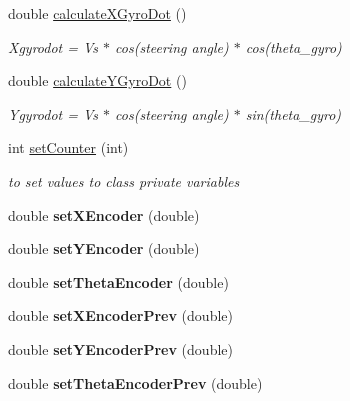 \begin{DoxyCompactItemize}
double \hyperlink{classPoseEstimator_aef49b0372edb2fe14499e6ae4ee237b7}{calculate\+X\+Gyro\+Dot} ()
\begin{DoxyCompactList}\small\item\em Xgyrodot = Vs $\ast$ cos(steering angle) $\ast$ cos(theta\+\_\+gyro) \end{DoxyCompactList}\item 
double \hyperlink{classPoseEstimator_a55a8b278aa3c3f171fff3b3501d5b14c}{calculate\+Y\+Gyro\+Dot} ()
\begin{DoxyCompactList}\small\item\em Ygyrodot = Vs $\ast$ cos(steering angle) $\ast$ sin(theta\+\_\+gyro) \end{DoxyCompactList}\item 
int \hyperlink{classPoseEstimator_a4dfacf5e449db6fc1398efd19e282b86}{set\+Counter} (int)
\begin{DoxyCompactList}\small\item\em to set values to class private variables \end{DoxyCompactList}\item 
double {\bfseries set\+X\+Encoder} (double)\hypertarget{classPoseEstimator_a4243ef5d948831d751a5dcb3685ba7ee}{}\label{classPoseEstimator_a4243ef5d948831d751a5dcb3685ba7ee}

\item 
double {\bfseries set\+Y\+Encoder} (double)\hypertarget{classPoseEstimator_abba09afe95f5a3932304987db9945e07}{}\label{classPoseEstimator_abba09afe95f5a3932304987db9945e07}

\item 
double {\bfseries set\+Theta\+Encoder} (double)\hypertarget{classPoseEstimator_a7c640b2411d1e2f1f6b0a2db78f1e61b}{}\label{classPoseEstimator_a7c640b2411d1e2f1f6b0a2db78f1e61b}

\item 
double {\bfseries set\+X\+Encoder\+Prev} (double)\hypertarget{classPoseEstimator_aec13e764bbab22c2f002b19c6ca47b91}{}\label{classPoseEstimator_aec13e764bbab22c2f002b19c6ca47b91}

\item 
double {\bfseries set\+Y\+Encoder\+Prev} (double)\hypertarget{classPoseEstimator_a302266772eaf1111aaa4d62c712cc0e8}{}\label{classPoseEstimator_a302266772eaf1111aaa4d62c712cc0e8}

\item 
double {\bfseries set\+Theta\+Encoder\+Prev} (double)\hypertarget{classPoseEstimator_a2fa4540528bc7022ccfba8ab4bf59b5c}{}\label{classPoseEstimator_a2fa4540528bc7022ccfba8ab4bf59b5c}


\end{DoxyCompactItemize}
